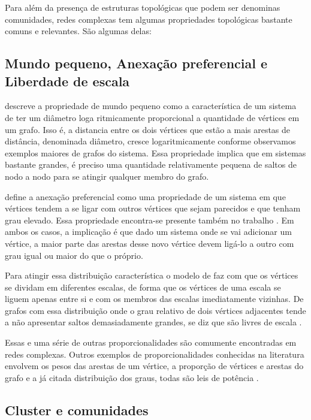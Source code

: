 \documentclass[notes.tex]{subfiles}
\begin{document}
Para além da presença de estruturas topológicas que podem ser denominas comunidades, redes complexas tem algumas propriedades topológicas bastante comuns e relevantes.
São algumas delas:

\subsection{Mundo pequeno, Anexação preferencial e Liberdade de escala}

 descreve a propriedade de mundo pequeno como a característica de um sistema de ter um diâmetro loga ritmicamente proporcional a quantidade de vértices em um grafo.
Isso é, a distancia entre os dois vértices que estão a mais arestas de distância, denominada diâmetro, cresce logaritmicamente conforme observamos exemplos maiores de grafos do sistema.
Essa propriedade implica que em sistemas bastante grandes, é preciso uma quantidade relativamente pequena de saltos de nodo a nodo para se atingir qualquer membro do grafo.

 define a anexação preferencial como uma propriedade de um sistema em que vértices tendem a se ligar com outros vértices que sejam parecidos e que tenham grau elevado.
Essa propriedade encontra-se presente também no trabalho .
Em ambos os casos, a implicação é que dado um sistema onde se vai adicionar um vértice, a maior parte das arestas desse novo vértice devem ligá-lo a outro com grau igual ou maior do que o próprio.

Para atingir essa distribuição característica o modelo de  faz com que os vértices se dividam em diferentes escalas, de forma que os vértices de uma escala se liguem apenas entre si e com os membros das escalas imediatamente vizinhas.
De grafos com essa distribuição onde o grau relativo de dois vértices adjacentes tende a não apresentar saltos demasiadamente grandes, se diz que são livres de escala \cite{largeron2015generating}.

Essas e uma série de outras proporcionalidades são comumente encontradas em redes complexas.
Outros exemplos de proporcionalidades conhecidas na literatura envolvem os pesos das arestas de um vértice, a proporção de vértices e arestas do grafo e a já citada distribuição dos graus, todas são leis de potência \cite{akoglu2009rtg}.

\subsection{Cluster e comunidades}
\end{document}
